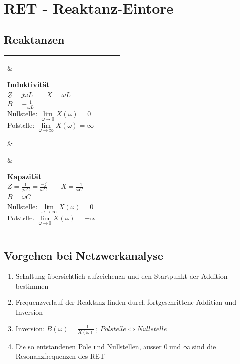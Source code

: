 \section{RET - Reaktanz-Eintore}
\subsection{Reaktanzen}
	\begin{tabular}{ll ll}
		\parbox{4cm}{
		
			}
			& \parbox{5cm}{
				\textbf{Induktivität} \\
				$\underline{Z}=j\omega L \qquad X=\omega L$\\
				$B=-\frac{1}{\omega L}$\\
				Nullstelle: $\lim\limits_{\omega \rightarrow 0} X(\omega) = 0$ \\
				Polstelle: $\lim\limits_{\omega \rightarrow \infty} X(\omega) = \infty$ \\
			}
			
			& \parbox{4cm}{
			
			}
			& \parbox{5cm}{
				\textbf{Kapazität} \\
				$\underline{Z}=\frac{1}{j\omega C}=\frac{-j}{\omega C} \qquad X=\frac{-1}{\omega C}$\\
				$B=\omega C$ \\
				Nullstelle: $\lim\limits_{\omega \rightarrow \infty} X(\omega) = 0$ \\
				Polstelle: $\lim\limits_{\omega \rightarrow 0} X(\omega) = -\infty$ \\
			}
	\end{tabular}
	
\subsection{Vorgehen bei Netzwerkanalyse}
	\begin{enumerate}{\setlength{\itemsep}{0cm}\setlength{\parsep}{0cm} \setlength{\topsep}{0cm}}
      \item Schaltung übersichtlich aufzeichenen und den Startpunkt der Addition bestimmen
      \item Frequenzverlauf der Reaktanz finden durch fortgeschrittene Addition und Inversion
      \item Inversion: $B(\omega)=\frac{-1}{X(\omega)}$ ; $Polstelle \Longleftrightarrow Nullstelle$
      \item Die so entstandenen Pole und Nullstellen, ausser 0 und $\infty$ sind die Resonanzfrequenzen des RET
    \end{enumerate}
	
